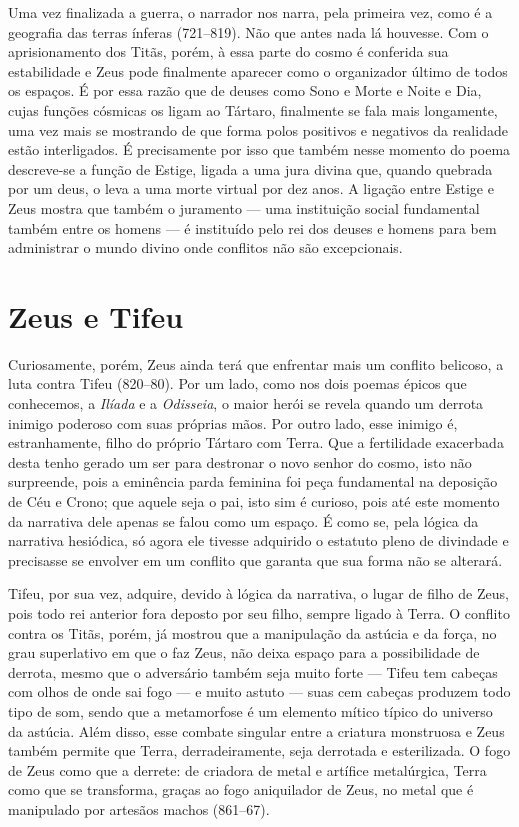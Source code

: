 Uma vez finalizada a guerra, o narrador nos narra, pela primeira vez,
como é a geografia das terras ínferas (721--819). Não que antes nada lá
houvesse. Com o aprisionamento dos Titãs, porém, à essa parte do cosmo é
conferida sua estabilidade e Zeus pode finalmente aparecer como o
organizador último de todos os espaços. É por essa razão que de deuses
como Sono e Morte e Noite e Dia, cujas funções cósmicas os ligam ao
Tártaro, finalmente se fala mais longamente, uma vez mais se mostrando
de que forma polos positivos e negativos da realidade estão
interligados. É precisamente por isso que também nesse momento do poema
descreve-se a função de Estige, ligada a uma jura divina que, quando
quebrada por um deus, o leva a uma morte virtual por dez anos. A ligação
entre Estige e Zeus mostra que também o juramento --- uma instituição
social fundamental também entre os homens --- é instituído pelo rei dos
deuses e homens para bem administrar o mundo divino onde conflitos não
são excepcionais.

\section{Zeus e Tifeu}

Curiosamente, porém, Zeus ainda terá que enfrentar mais um conflito
belicoso, a luta contra Tifeu (820--80). Por um lado, como nos dois
poemas épicos que conhecemos, a \textit{Ilíada} e a \textit{Odisseia}, o
maior herói se revela quando um derrota inimigo poderoso com suas
próprias mãos. Por outro lado, esse inimigo é, estranhamente, filho do
próprio Tártaro com Terra. Que a fertilidade exacerbada desta tenho
gerado um ser para destronar o novo senhor do cosmo, isto não
surpreende, pois a eminência parda feminina foi peça fundamental na
deposição de Céu e Crono; que aquele seja o pai, isto sim é curioso,
pois até este momento da narrativa dele apenas se falou como um espaço.
É como se, pela lógica da narrativa hesiódica, só agora ele tivesse
adquirido o estatuto pleno de divindade e precisasse se envolver em um
conflito que garanta que sua forma não se alterará.

Tifeu, por sua vez, adquire, devido à lógica da narrativa, o lugar de
filho de Zeus, pois todo rei anterior fora deposto por seu filho, sempre
ligado à Terra. O conflito contra os Titãs, porém, já mostrou que a
manipulação da astúcia e da força, no grau superlativo em que o faz
Zeus, não deixa espaço para a possibilidade de derrota, mesmo que o
adversário também seja muito forte --- Tifeu tem cabeças com olhos de
onde sai fogo --- e muito astuto --- suas cem cabeças produzem todo tipo
de som, sendo que a metamorfose é um elemento mítico típico do universo
da astúcia. Além disso, esse combate singular entre a criatura
monstruosa e Zeus também permite que Terra, derradeiramente, seja
derrotada e esterilizada. O fogo de Zeus como que a derrete: de criadora
de metal e artífice metalúrgica, Terra como que se transforma, graças ao
fogo aniquilador de Zeus, no metal que é manipulado por artesãos machos
(861--67).

